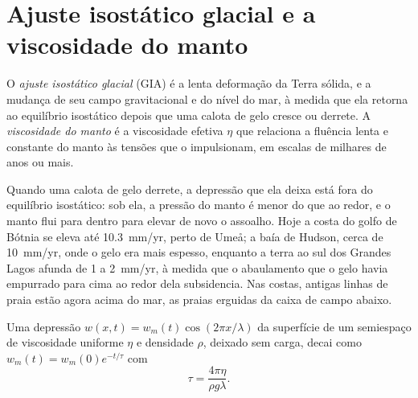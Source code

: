 \section{Ajuste isostático glacial e a viscosidade do manto}\label{sec:b3:mantle-convection:gia}

\begin{definition}\label{def:b3:mantle-convection:gia}
O \emph{ajuste isostático glacial} (GIA)
é a lenta deformação da Terra sólida, e a mudança de seu campo gravitacional
e do nível do mar, à medida que ela retorna ao equilíbrio isostático depois que uma
calota de gelo cresce ou derrete. A \emph{viscosidade do manto}
é a viscosidade efetiva $\eta$ que relaciona a fluência lenta e constante do manto
às tensões que o impulsionam, em escalas de milhares de anos ou mais.
\end{definition}

Quando uma calota de gelo derrete, a depressão que ela deixa está fora do equilíbrio
isostático: sob ela, a pressão do manto é menor do que ao redor, e o manto flui para dentro
para elevar de novo o assoalho. Hoje a costa do golfo de Bótnia
se eleva até \qty{10.3}{mm/yr}, perto de Umeå; a baía de Hudson, cerca de
\qty{10}{mm/yr}, onde o gelo era mais espesso, enquanto a terra ao sul dos Grandes
Lagos afunda de 1 a \qty{2}{mm/yr}, à medida que o abaulamento que o gelo havia empurrado
para cima ao redor dela subsidencia. Nas costas, antigas linhas de praia estão agora acima do mar,
as praias erguidas da caixa de campo abaixo.

\begin{theorem}\label{thm:b3:mantle-convection:relaxation}
Uma depressão $w(x, t) = w_m(t)\cos(2\pi x/\lambda)$ da superfície de um
semiespaço de viscosidade uniforme $\eta$ e densidade $\rho$, deixado sem carga,
decai como $w_m(t) = w_m(0)e^{-t/\tau}$ com
\[
  \tau = \frac{4\pi\eta}{\rho g\lambda} .
\]
\end{theorem}


